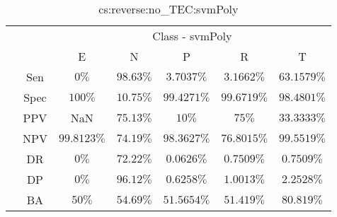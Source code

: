 \begin{table}[!ht]
	\centering
	\begin{tabular}{|c|c|c|c|c|c|c|}
		\cline{3-7}
		\multicolumn{2}{c|}{} & \multicolumn{5}{c|}{Class - svmPoly} \\ \cline{3-7}
		\multicolumn{2}{c|}{} & E & N & P & R & T \\ \hline
		\multirow{7}{*}{\rotatebox{90}{Statistics}} & Sen & $0\%$ & $98.63\%$ & $3.7037\%$ & $3.1662\%$ & $63.1579\%$ \\ \cline{2-7}
		 & Spec & $100\%$ & $10.75\%$ & $99.4271\%$ & $99.6719\%$ & $98.4801\%$ \\ \cline{2-7}
		 & PPV & NaN & $75.13\%$ & $10\%$ & $75\%$ & $33.3333\%$ \\ \cline{2-7}
		 & NPV & $99.8123\%$ & $74.19\%$ & $98.3627\%$ & $76.8015\%$ & $99.5519\%$ \\ \cline{2-7}
		 & DR & $0\%$ & $72.22\%$ & $0.0626\%$ & $0.7509\%$ & $0.7509\%$ \\ \cline{2-7}
		 & DP & $0\%$ & $96.12\%$ & $0.6258\%$ & $1.0013\%$ & $2.2528\%$ \\ \cline{2-7}
		 & BA & $50\%$ & $54.69\%$ & $51.5654\%$ & $51.419\%$ & $80.819\%$ \\ \hline
	\end{tabular}
	\caption{cs:reverse:no_TEC:svmPoly}
	\label{tab:cs:reverse:no_TEC:svmPoly}
\end{table}
